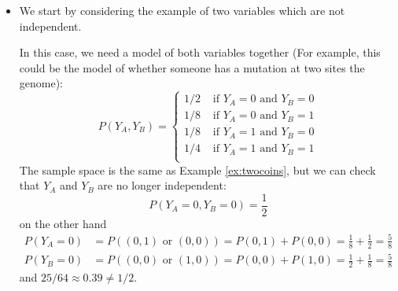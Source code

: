 \begin{itemize}
\item We start by considering the example of two variables which are not independent. 
\begin{example}\label{ex:mut} In this case, we need a model of both variables together (For example, this could be the model of whether someone has a mutation at two sites the genome):
\begin{equation*}\label{eq:gene}
P(Y_A,Y_B) = \left\{ \begin{array}{cc}
1/2 & \text{ if }Y_A=0 \text{ and } Y_B = 0\\
1/8 & \text{ if }Y_A=0 \text{ and } Y_B = 1\\
1/8 & \text{ if }Y_A=1 \text{ and } Y_B = 0\\
1/4 & \text{ if }Y_A=1 \text{ and } Y_B = 1\\
\end{array}
 \right.
\end{equation*}
The sample space is the same as Example \ref{ex:twocoins}, but we can check that $Y_A$ and $Y_B$ are no longer independent:
\begin{equation*}
P(Y_A=0,Y_B=0) =  \frac{1}{2}
\end{equation*}
on the other hand 
\begin{align*}
P(Y_A=0) &= P((0,1) \text{ or }(0,0)) = P(0,1) + P(0,0) = \frac{1}{8} + \frac{1}{2} =\frac{5}{8} \\
P(Y_B=0) &= P((0,0) \text{ or }(1,0)) = P(0,0) + P(1,0) = \frac{1}{2} + \frac{1}{8}= \frac{5}{8}
\end{align*}
and $25/64  \approx  0.39 \ne 1/2$. 





\end{example}
\end{itemize}
